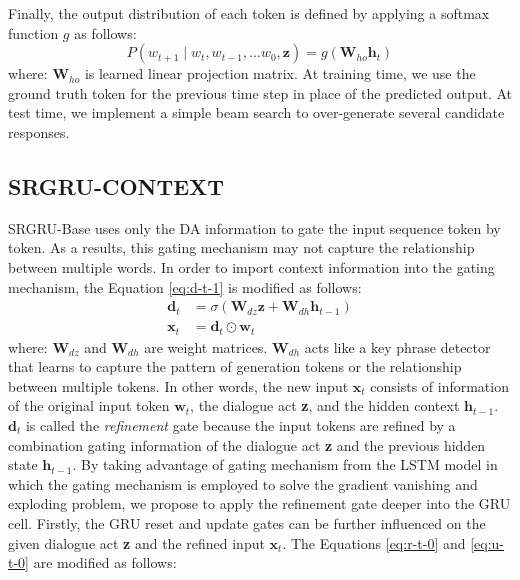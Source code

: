 \documentclass{llncs}
\begin{document}
Finally, the output distribution of each token is defined by applying a softmax function $g$ as follows:
\begin{equation}\label{eq:p-t-1}
P(w_{t+1}\mid w_{t}, w_{t-1},...w_{0},\textbf{z}) = g(\textbf{W}_{ho}\textbf{h}_{t})
\end{equation}
where: $\textbf{W}_{ho}$ is learned linear projection matrix. At training time, we use the ground truth token for the previous time step in place of the predicted output. At test time, we implement a simple beam search to over-generate several candidate responses. 

\subsection{SRGRU-CONTEXT}\label{subsec:srgru-context}
SRGRU-Base uses only the DA information to gate the input sequence token by token. As a results, this gating mechanism may not capture the relationship between multiple words. In order to import context information into the gating mechanism, the Equation \ref{eq:d-t-1} is modified as follows:
\begin{equation}\label{eq:d-t-2}
\begin{aligned}
	\textbf{d}_{t}&=\sigma(\textbf{W}_{dz}\textbf{z} + \textbf{W}_{dh}\textbf{h}_{t-1})\\
	\textbf{x}_{t}&=\textbf{d}_{t} \odot \textbf{w}_{t} 
\end{aligned}
\end{equation}
where: $\textbf{W}_{dz}$ and $\textbf{W}_{dh}$ are weight matrices. $\textbf{W}_{dh}$ acts like a key phrase detector that learns to capture the pattern of generation tokens or the relationship between multiple tokens. In other words, the new input $\textbf{x}_{t}$ consists of information of the original input token $\textbf{w}_{t}$, the dialogue act \textbf{z}, and the hidden context $\textbf{h}_{t-1}$. $\textbf{d}_{t}$ is called the \textit{refinement} gate because the input tokens are refined by a combination gating information of the dialogue act \textbf{z} and the previous hidden state $\textbf{h}_{t-1}$. By taking advantage of gating mechanism from the LSTM model \cite{hochreiter1997long} in which the gating mechanism is employed to solve the gradient vanishing and exploding problem, we propose to apply the refinement gate deeper into the GRU cell. Firstly, the GRU reset and update gates can be further influenced on the given dialogue act \textbf{z} and the refined input $\textbf{x}_{t}$. The Equations \eqref{eq:r-t-0} and \eqref{eq:u-t-0} are modified as follows:
\end{document}
